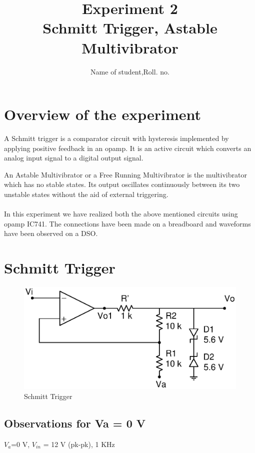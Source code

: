 \documentclass[12pt]{article}
\title{Experiment 2\\
Schmitt Trigger, Astable Multivibrator}
\author{Name of student,Roll. no.}
\begin{document}
\maketitle

\section{Overview of the experiment}
A Schmitt trigger is a comparator circuit with hysteresis implemented by applying positive feedback in an opamp. It is an active circuit which converts an analog input signal to a digital output signal.

An Astable Multivibrator or a Free Running Multivibrator is the multivibrator which has no stable states. Its output oscillates continuously between its two unstable states without the aid of external triggering.
\\
\\In this experiment we have realized both the above mentioned circuits using opamp IC741. The connections have been made on a breadboard and waveforms have been observed on a DSO.


\section{Schmitt Trigger}

\begin{figure}[h]
\centering
\includegraphics[scale=0.5]{schmitttriggerr.eps}
\caption{Schmitt Trigger}
\end{figure}

\subsection{Observations for Va = 0 V }
$V_{a}$=0 V,  $V_{in}$ = 12 V (pk-pk), 1 KHz 
\end{document}
